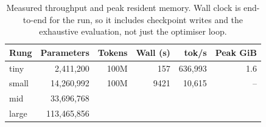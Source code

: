 \begin{table}[htbp]
\centering
\caption{Measured throughput and peak resident memory. Wall clock is
end-to-end for the run, so it includes checkpoint writes and the exhaustive
evaluation, not just the optimiser loop.}
\label{tab:throughput}
\begin{tabular}{lrrrrr}
\toprule
Rung & Parameters & Tokens & Wall (s) & tok/s & Peak GiB \\
\midrule
tiny & 2{,}411{,}200 & 100M & 157 & 636,993 & 1.6 \\
small & 14{,}260{,}992 & 100M & 9421 & 10,615 & -- \\
mid & 33{,}696{,}768 & & & & \\
large & 113{,}465{,}856 & & & & \\
\bottomrule
\end{tabular}
\end{table}
